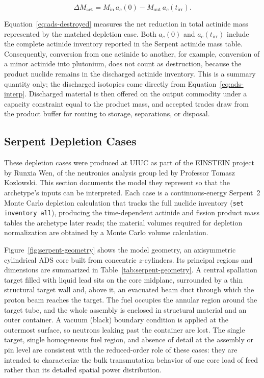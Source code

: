 \begin{equation}
    \Delta M_{\mathrm{act}} =
        M_{\mathrm{in}}\,a_c(0) - M_{\mathrm{out}}\,a_c(t_{\mathrm{irr}}).
    \label{eq:ads-destroyed}
\end{equation}

Equation~\ref{eq:ads-destroyed} measures the net reduction in total
actinide mass represented by the matched depletion case. Both
\(a_c(0)\) and \(a_c(t_{\mathrm{irr}})\) include the complete actinide inventory
reported in the Serpent actinide mass table. Consequently, conversion from one
actinide to another, for example, conversion of a minor actinide into
plutonium, does not count as destruction, because the product nuclide remains
in the discharged actinide inventory. This is a summary quantity only; the
discharged isotopics come directly from Equation~\ref{eq:ads-interp}. Discharged
material is then offered on the output commodity under a capacity constraint
equal to the product mass, and accepted trades draw from the product buffer for
routing to storage, separations, or disposal.

\subsection{Serpent Depletion Cases}
\label{subsec:serpent-cases}

These depletion cases were produced at \gls{UIUC} as part of the \gls{EINSTEIN}
project by Runxia Wen, of the neutronics analysis group led by Professor Tomasz
Kozlowski. This section documents the model they represent so that the
archetype's inputs can be interpreted. Each case is a continuous-energy
Serpent~2 Monte Carlo depletion calculation
\cite{leppanenStatusSerpentMonte2025} that tracks the full nuclide inventory
(\texttt{set inventory all}), producing the time-dependent actinide and
fission product mass tables the archetype later reads; the material volumes
required for depletion normalization are obtained by a Monte Carlo volume
calculation.

Figure~\ref{fig:serpent-geometry} shows the model geometry, an axisymmetric
cylindrical \gls{ADS} core built from concentric \(z\)-cylinders. Its principal
regions and dimensions are summarized in Table~\ref{tab:serpent-geometry}. A
central spallation target filled with liquid lead sits on the core midplane,
surrounded by a
thin structural target wall and, above it, an evacuated beam duct through which
the proton beam reaches the target. The fuel occupies the annular region around
the target tube, and the whole assembly is enclosed in structural material and
an outer container. A vacuum (black) boundary condition is applied at the
outermost surface, so neutrons leaking past the container are lost. The single
target, single homogeneous fuel region, and absence of detail at the assembly
or pin level are consistent with the reduced-order role of these cases: they are
intended to characterize the bulk transmutation behavior of one core load of
feed rather than its detailed spatial power distribution.

